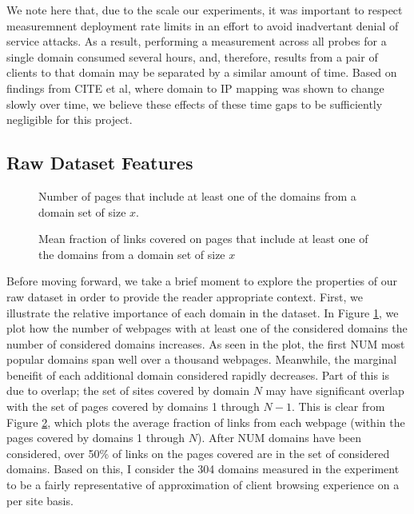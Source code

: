 We note here that, due to the scale our experiments, it was important to respect measuremnent
deployment rate limits in an effort to avoid inadvertant denial of service attacks. As a result,
performing a measurement across all probes for a single domain consumed several hours, and,
therefore, results from a pair of clients to that domain may be separated by a similar amount of
time. Based on findings from CITE et al, where domain to IP mapping was shown to change slowly over
time, we believe these effects of these time gaps to be sufficiently negligible for this project. 

\subsection{Raw Dataset Features}

\begin{figure*}
    \center
            \begin{subfigure}[b]{.7\linewidth}
                \caption{Number of pages that include at least one of the domains from a domain set
                of size $x$.}
                \label{num_pages}
            \end{subfigure}
            \begin{subfigure}[b]{0.7\linewidth}
                \caption{Mean fraction of links covered on pages that include at least one of the
                domains from a domain set of size $x$}
                \label{frac_links}
            \end{subfigure}
\end{figure*}

Before moving forward, we take a brief moment to explore the properties of our raw dataset in order
to provide the reader appropriate context. First, we illustrate the relative importance of each
domain in the dataset. In Figure \ref{num_pages}, we plot how the number of webpages with at least
one of the
considered domains the number of considered domains increases. As seen in the plot, the first
NUM most popular domains span well over a thousand webpages. Meanwhile, the marginal beneifit of
each additional domain considered rapidly decreases. Part of this is due to overlap; the set of
sites covered by domain $N$ may have significant overlap with the set of pages covered by domains 1
through $N-1$. This is clear from Figure \ref{frac_links}, which plots the average fraction of links from each
webpage (within the pages covered by domains 1 through $N$). After NUM domains have been considered,
over 50\% of links on the pages covered are in the set of considered domains. Based on this, I
consider the 304 domains measured in the experiment to be a fairly representative of approximation
of client browsing experience on a per site basis. 

